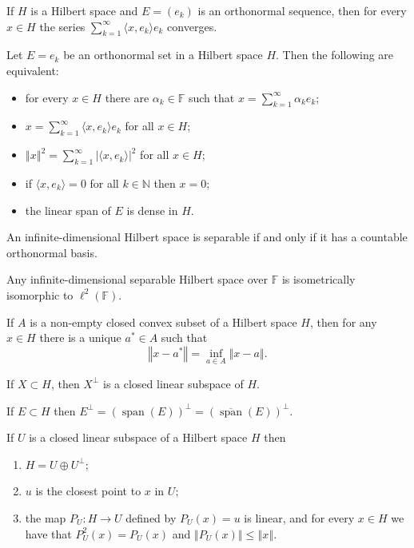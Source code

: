 \documentclass[a4paper]{article}
\newcommand{\N}{\mathbb{N}}
\newcommand{\F}{\mathbb{F}}
\newcommand{\norm}[1]{\left\Vert #1 \right\Vert}
\newcommand{\<}{\langle}
\renewcommand{\>}{\rangle}
\renewcommand{\a}{\alpha}
\renewcommand{\span}{\operatorname{span}}
\begin{document}
\begin{prop}
  If $H$ is a Hilbert space and $E = (e_k)$ is an orthonormal sequence, then for every $x\in H$ the series $\sum_{k=1}^\infty \<x,e_k\>e_k$ converges.
\end{prop}

\begin{prop}
  Let $E={e_k}$ be an orthonormal set in a Hilbert space $H$. Then the following are equivalent:
  \begin{itemize}
    \item for every $x\in H$ there are $\a_k\in\F$ such that $x = \sum_{k=1}^\infty \a_k e_k$;
    \item $x = \sum_{k=1}^\infty\<x,e_k\>e_k$ for all $x\in H$;
    \item $\norm{x}^2 = \sum_{k=1}^\infty|\<x,e_k\>|^2$ for all $x\in H$;
    \item if $\<x,e_k\>=0$ for all $k\in\N$ then $x=0$;
    \item the linear span of $E$ is dense in $H$.
  \end{itemize}
\end{prop}

\begin{thm}
  An infinite-dimensional Hilbert space is separable if and only if it has a countable orthonormal basis.
\end{thm}

\begin{thm}
  Any infinite-dimensional separable Hilbert space over $\F$ is isometrically isomorphic to $\ell^2(\F)$.
\end{thm}

\begin{lemma}
  If $A$ is a non-empty closed convex subset of a Hilbert space $H$, then for any $x\in H$ there is a unique $a^*\in A$ such that
  $$\norm{x-a^*}=\inf_{a\in A}\norm{x-a}.$$
\end{lemma}

\begin{prop}
  If $X\subset H$, then $X^\perp$ is a closed linear subspace of $H$.
\end{prop}

\begin{prop}
  If $E\subset H$ then $E^\perp = (\span(E))^\perp = (\overline{\span}(E))^\perp$.
\end{prop}

\begin{thm}
  If $U$ is a closed linear subspace of a Hilbert space $H$ then
  \begin{enumerate}
    \item $H = U\oplus U^\perp$;
    \item $u$ is the closest point to $x$ in $U$;
    \item the map $P_U:H\to U$ defined by $P_U(x)=u$ is linear, and for every $x\in H$ we have that $P_U^2(x)=P_U(x)$ and $\norm{P_U(x)}\leq\norm{x}$.
  \end{enumerate}
\end{thm}
\end{document}
